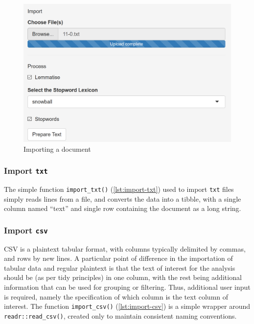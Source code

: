 \documentclass[11pt, a4paper, titlepage]{report}
\begin{document}
\begin{figure}
  \centering
  \includegraphics[scale=0.7]{processing-import-process.png}
  \caption{Importing a document\label{fig:processing-import-pro}}
\end{figure}

\subsubsection{Import \texttt{txt}}

The simple function \texttt{import_txt()}
(\underline{\cref{lst:import-txt}}) used to import \texttt{txt} files
simply reads lines from a file, and converts the data into a
tibble\autocite{muller19tib}, with a single column named ``text'' and
single row containing the document as a long string.

\subsubsection{Import \texttt{csv}}

CSV is a plaintext tabular format, with columns typically delimited by
commas, and rows by new lines. A particular point of difference in the
importation of tabular data and regular plaintext is that the text of
interest for the analysis should be (as per tidy principles) in one
column, with the rest being additional information that can be used
for grouping or filtering. Thus, additional user input is required,
namely the specification of which column is the text column of
interest. The function \texttt{import_csv()}
(\underline{\cref{lst:import-csv}}) is a simple wrapper around
\texttt{readr::read_csv()}\autocite{wickham18red}, created only
to maintain consistent naming conventions.
\end{document}
